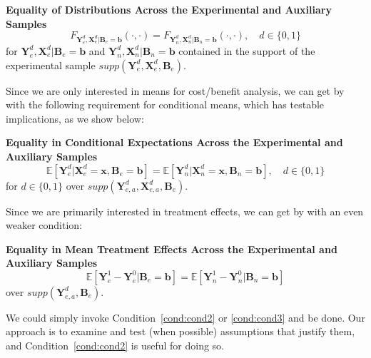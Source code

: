 \onehalfspacing
\begin{condition} \textbf{Equality of Distributions Across the Experimental and Auxiliary Samples \label{cond:cond1}}
\begin{equation}
F_{\bm{Y}_e^d, \bm{X}_e^d | \bm{B}_e = \bm{b}} \left( \cdot, \cdot \right) = F_{\bm{Y}_n^d, \bm{X}_n^d | \bm{B}_n = \bm{b}} \left( \cdot, \cdot \right), \quad d \in \{0,1\}
\end{equation}
\noindent for $\bm{Y}_e^d, \bm{X}^d_e | \bm{B}_e = \bm{b}$ and $\bm{Y}_n^d, \bm{X}^d_n | \bm{B}_n = \bm{b}$ contained in the support of the experimental sample $supp\left(\bm{Y}^d_{e}, \bm{X}^d_{e}, \bm{B}_{e} \right)$.
\end{condition}
\doublespacing

Since we are only interested in means for cost/benefit analysis, we can get by with the following requirement for conditional means, which has testable implications, as we show below:

\onehalfspacing
\begin{condition} \textbf{Equality in Conditional Expectations Across the Experimental and Auxiliary Samples \label{cond:cond2}}
\begin{equation}
\mathbb{E} \left[ \bm{Y}_e^d |  \bm{X}_e^d = \bm{x}, \bm{B}_e = \bm{b} \right] = \mathbb{E} \left[ \bm{Y}_n^d |  \bm{X}_n^d = \bm{x}, \bm{B}_n = \bm{b} \right], \quad d \in \{0,1\}
\end{equation}
for $d \in \{0, 1 \}$ over $supp\left(\bm{Y}^d_{e,a}, \bm{X}^d_{e,a}, \bm{B}_e\right)$.
\end{condition}
\doublespacing

Since we are primarily interested in treatment effects, we can get by with an even weaker condition:

\onehalfspacing
\begin{condition} \textbf{Equality in Mean Treatment Effects Across the Experimental and Auxiliary Samples \label{cond:cond3}}
\begin{equation}
\mathbb{E} \left[ \bm{Y}_e^1 - \bm{Y}_e^0 | \bm{B}_e = \bm{b} \right] = \mathbb{E} \left[ \bm{Y}_n^1 - \bm{Y}_n^0 | \bm{B}_n = \bm{b} \right]
\end{equation}
over $supp\left(\bm{Y}^d_{e,a}, \bm{B}_e\right)$.
\end{condition}
\doublespacing
We could simply invoke Condition~\ref{cond:cond2} or \ref{cond:cond3} and be done. Our approach is to examine and test (when possible) assumptions that justify them, and Condition~\ref{cond:cond2} is useful for doing so.


